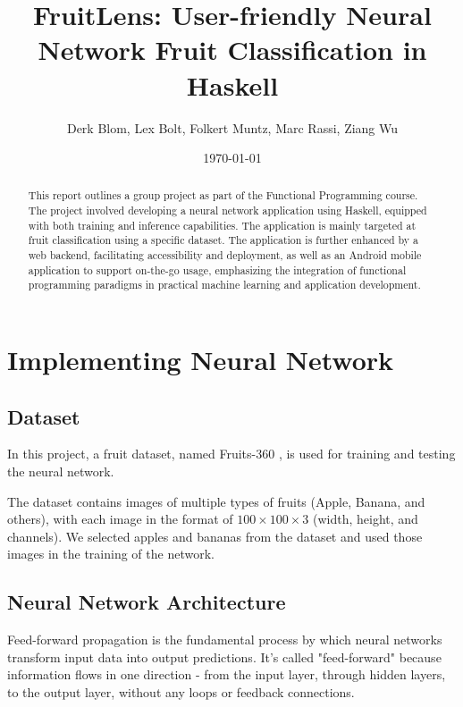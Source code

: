 \documentclass[12pt,a4paper]{article}
\title{FruitLens: User-friendly Neural Network Fruit Classification in Haskell}
\author{Derk Blom, Lex Bolt, Folkert Muntz, Marc Rassi, Ziang Wu}
\date{\today}
\begin{document}
\maketitle

\begin{abstract}
This report outlines a group project as part of the Functional Programming course. The project involved developing a neural network application using Haskell, equipped with both training and inference capabilities. The application is mainly targeted at fruit classification using a specific dataset. The application is further enhanced by a web backend, facilitating accessibility and deployment, as well as an Android mobile application to support on-the-go usage, emphasizing the integration of functional programming paradigms in practical machine learning and application development.
\end{abstract}

\vfill

\tableofcontents

\clearpage


\section{Implementing Neural Network}

\subsection{Dataset}
In this project, a fruit dataset, named Fruits-360 \cite{oltean_fruits-360_2017}, is used for training and testing the neural network.

The dataset contains images of multiple types of fruits (Apple, Banana, and others), with each image in the format of $100 \times 100 \times 3$ (width, height, and channels). We selected apples and bananas from the dataset and used those images in the training of the network.

% 

\subsection{Neural Network Architecture}
Feed-forward propagation is the fundamental process by which neural networks transform input data into output predictions. It's called "feed-forward" because information flows in one direction - from the input layer, through hidden layers, to the output layer, without any loops or feedback connections.
\end{document}
